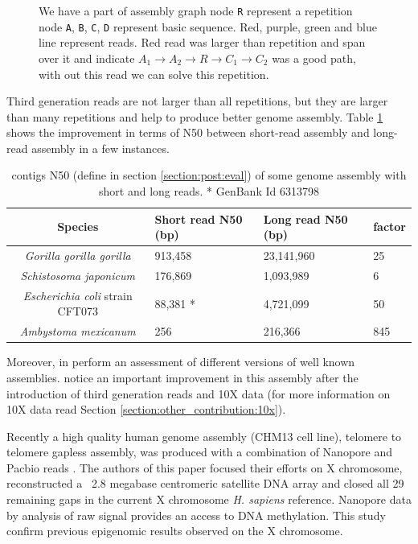 \documentclass[main]{subfiles}
\begin{document}
\begin{figure}[ht]
    \centering
    
    \caption{We have a part of assembly graph node \texttt{R} represent a repetition node \texttt{A}, \texttt{B}, \texttt{C}, \texttt{D} represent basic sequence. Red, purple, green and blue line represent reads. Red read was larger than repetition and span over it and indicate $A_1 \rightarrow A_2 \rightarrow R \rightarrow C_1 \rightarrow C_2$ was a good path, with out this read we can solve this repetition.}
    \label{intro:fig:whylongreads}
\end{figure}

Third generation reads are not larger than all repetitions, but they are larger than many repetitions and help to produce better genome assembly. Table \ref{intro:tab:sr_lr_assembly} shows the improvement in terms of N50 between short-read assembly and long-read assembly in a few instances. 

\begin{table}[]
    \centering
    \begin{tabular}{c|lll}
        Species & Short read N50 (bp) & Long read N50 (bp) & factor \\ \hline
        \textit{Gorilla gorilla gorilla} & 913,458 \cite{gorilla_sr_assembly} & 23,141,960 \cite{gorilla_genome} & 25 \\
        \textit{Schistosoma japonicum} & 176,869 \cite{s_japonicum_sr_assembly} & 1,093,989 \cite{s_japonicum_3rd_gene_improvement} & 6 \\
        \textit{Escherichia coli} strain CFT073 & 88,381 * & 4,721,099 \cite{publi_dataset} & 50 \\
        \textit{Ambystoma mexicanum} & 256 \cite{axolot_short} & 216,366 \cite{axolot_long} & 845 \\
    \end{tabular}
    \caption{contigs N50 (define in section \ref{section:post:eval}) of some genome assembly with short and long reads. * GenBank Id 6313798}
    \label{intro:tab:sr_lr_assembly}
\end{table}

Moreover, \citeauthor{dnAQET} in \cite{dnAQET} perform an assessment of different versions of well known assemblies. \citeauthor{dnAQET} notice an important improvement in this assembly after the introduction of third generation reads and 10X data (for more information on 10X data read Section \ref{section:other_contribution:10x}).

Recently a high quality human genome assembly (CHM13 cell line), telomere to telomere gapless assembly, was produced with a combination of Nanopore and Pacbio reads \cite{telomere2telomere}. The authors of this paper focused their efforts on X chromosome, reconstructed a ~2.8 megabase centromeric satellite DNA array and closed all 29 remaining gaps in the current X chromosome \textit{H. sapiens} reference. Nanopore data by analysis of raw signal provides an access to DNA methylation. This study confirm previous epigenomic results observed on the X chromosome.
\end{document}
